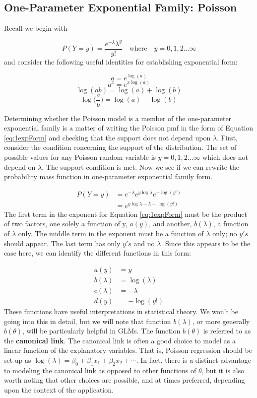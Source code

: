 \documentclass[
]{krantz}
\begin{document}
\hypertarget{one-parameter-exponential-family-poisson}{%
\subsection{One-Parameter Exponential Family: Poisson}\label{one-parameter-exponential-family-poisson}}

Recall we begin with

\[
P(Y=y)=\frac{e^{-\lambda}{\lambda}^y}{y!}\quad \textrm{where}\quad y=0,1,2\ldots\infty
\]
and consider the following useful identities for establishing exponential form:

\[a=e^{\log(a)} \]
\[a^x = e^{x\log(a)}\]
\[\log(ab)=\log(a)+\log(b)\]
\[\log\Big(\frac{a}{b}\Big)=\log(a)-\log(b)\]

Determining whether the Poisson model is a member of the one-parameter exponential family is a matter of writing the Poisson pmf in the form of Equation \eqref{eq:1expForm} and checking that the support does not depend upon \(\lambda\). First, consider the condition concerning the support of the distribution. The set of possible values for any Poisson random variable is \(y=0,1,2\ldots\infty\) which does not depend on \(\lambda\). The support condition is met. Now we see if we can rewrite the probability mass function in one-parameter exponential family form.

\begin{align*}
 P(Y=y)&= {e^{-\lambda}e^{y\log \lambda}e^{-\log (y!)}} \nonumber \\
       &= e^{y\log \lambda-\lambda-\log (y!)}
 \end{align*}
The first term in the exponent for Equation \eqref{eq:1expForm} must be the product of two factors, one solely a function of y, \(a(y)\), and another, \(b(\lambda)\), a function of \(\lambda\) only. The middle term in the exponent must be a function of \(\lambda\) only; no \(y's\) should appear. The last term has only \(y's\) and no \(\lambda\). Since this appears to be the case here, we can identify the different functions in this form:

\begin{align*}
a(y)&=y \\
b(\lambda)&=\log(\lambda) \\
c(\lambda)&=-\lambda \\
d(y)&=-\log (y!)
\label{eq:diffunc}
\end{align*}
These functions have useful interpretations in statistical theory. We won't be going into this in detail, but we will note that function \(b(\lambda)\), or more generally \(b(\theta)\), will be particularly helpful in GLMs. The function \(b(\theta)\) is referred to as the \textbf{canonical link}.  The canonical link is often a good choice to model as a linear function of the explanatory variables. That is, Poisson regression should be set up as \(\log(\lambda)=\beta_0+\beta_1x_1+\beta_2x_2+\cdots\). In fact, there is a distinct advantage to modeling the canonical link as opposed to other functions of \(\theta\), but it is also worth noting that other choices are possible, and at times preferred, depending upon the context of the application.
\end{document}
